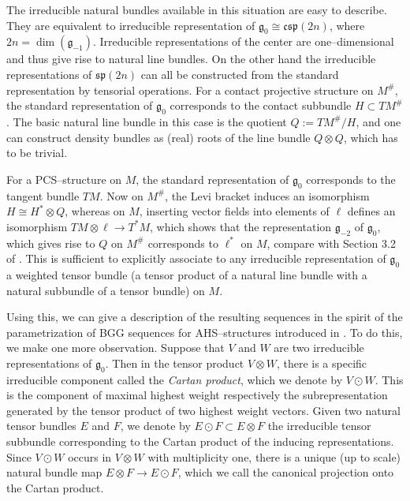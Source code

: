 \documentclass[12pt,a4paper]{amsart}
\def\frak{\mathfrak}
\numberwithin{theorem}{section}
\theoremstyle{definition}
\theoremstyle{remark}
\begin{document}
The irreducible natural bundles available in this situation are easy
to describe. They are equivalent to irreducible representation of
$\frak g_0\cong\mathfrak{csp}(2n)$, where $2n=\dim(\frak
g_{-1})$. Irreducible representations of the center are
one--dimensional and thus give rise to natural line bundles. On the
other hand the irreducible representations of $\frak{sp}(2n)$ can all
be constructed from the standard representation by tensorial
operations. For a contact projective structure on $M^\#$, the standard
representation of $\frak g_0$ corresponds to the contact subbundle
$H\subset TM^\#$. The basic natural line bundle in this case is the
quotient $Q:=TM^\#/H$, and one can construct density bundles as (real)
roots of the line bundle $Q\otimes Q$, which has to be trivial. 

For a PCS--structure on $M$, the standard representation of $\frak
g_0$ corresponds to the tangent bundle $TM$. Now on $M^\#$, the Levi
bracket induces an isomorphism $H\cong H^*\otimes Q$, whereas on $M$,
inserting vector fields into elements of $\ell$ defines an isomorphism
$TM\otimes\ell\to T^*M$, which shows that the representation $\frak
g_{-2}$ of $\frak g_0$, which gives rise to $Q$ on $M^\#$ corresponds
to $\ell^*$ on $M$, compare with Section 3.2 of \cite{Cap-Salac}. This
is sufficient to explicitly associate to any irreducible
representation of $\frak g_0$ a weighted tensor bundle (a tensor
product of a natural line bundle with a natural subbundle of a tensor
bundle) on $M$.

Using this, we can give a description of the resulting sequences in
the spirit of the parametrization of BGG sequences for AHS--structures
introduced in \cite{BCEG}. To do this, we make one more
observation. Suppose that $V$ and $W$ are two irreducible
representations of $\frak g_0$. Then in the tensor product $V\otimes
W$, there is a specific irreducible component called the
\textit{Cartan product}, which we denote by $V\odot W$. This is the
component of maximal highest weight respectively the subrepresentation
generated by the tensor product of two highest weight vectors. Given
two natural tensor bundles $E$ and $F$, we denote by $E\odot F\subset
E\otimes F$ the irreducible tensor subbundle corresponding to the
Cartan product of the inducing representations. Since $V\odot W$
occurs in $V\otimes W$ with multiplicity one, there is a unique (up to
scale) natural bundle map $E\otimes F\to E\odot F$, which we call the
canonical projection onto the Cartan product.
\end{document}
